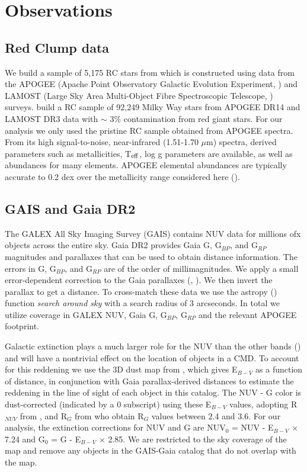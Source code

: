 \documentclass[twocolumn]{emulateapj}
\begin{document}
\section{Observations}
\subsection{Red Clump data}

We build a sample of 5,175 RC stars from \citealt{ting18} which is constructed using data from the APOGEE (Apache Point Observatory Galactic Evolution Experiment, \citealt{apogee2017}) and LAMOST (Large Sky Area Multi-Object Fibre Spectroscopic Telescope, \citealt{lamost}) surveys. \citealt{ting18} build a RC sample of 92,249 Milky Way stars from APOGEE DR14 and LAMOST DR3 data with $\sim$ 3$\%$ contamination from red giant stars. For our analysis we only used the pristine RC sample obtained from APOGEE spectra. From its high signal-to-noise, near-infrared (1.51-1.70 $\mu$m) spectra, derived parameters such as metallicities, T$_{\rm{eff}}$, log g parameters are available, as well as abundances for many elements. APOGEE elemental abundances are typically accurate to 0.2 dex over the metallicity range considered here (\citealt{ASPCAP}).

\subsection{GAIS and Gaia DR2}
The GALEX All Sky Imaging Survey (GAIS) contains NUV data for millions ofx objects across the entire sky. Gaia DR2 provides Gaia G, G$_{BP}$, and G$_{RP}$ magnitudes and parallaxes that can be used to obtain distance information. The errors in G, G$_{BP}$, and G$_{RP}$ are of the order of millimagnitudes. We apply a small error-dependent correction to the Gaia parallaxes (\citealt{lutzkelker73}, \citealt{Oudmaijer98}). We then invert the parallax to get a distance. To cross-match these data we use the astropy (\citealt{astropy}) function \textit{search around sky} with a search radius of 3 arcseconds. In total we utilize coverage in GALEX NUV, Gaia G, G$_{BP}$, G$_{RP}$ and the relevant APOGEE footprint.

Galactic extinction plays a much larger role for the NUV than the other bands (\citealt{ccm89}) and will have a nontrivial effect on the location of objects in a CMD. To account for this reddening we use the 3D dust map from \citealt{GSF15}, which gives E$_{B - V}$ as a function of distance, in conjunction with Gaia parallax-derived distances to estimate the reddening in the line of sight of each object in this catalog. The NUV - G color is dust-corrected (indicated by a 0 subscript) using these E$_{B - V}$ values, adopting R$_{NUV}$ from \citealt{yuan13}, and R$_G$ from \citealt{jordi2010} who obtain R$_G$ values between 2.4 and 3.6. For our analysis, the extinction corrections for NUV and G are NUV$_0$ = NUV - E$_{B - V}$ $\times$ 7.24 and G$_0$ = G - E$_{B - V}$ $\times$ 2.85. We are restricted to the sky coverage of the \citealt{GSF15} map and remove any objects in the GAIS-Gaia catalog that do not overlap with the map. 
\end{document}
